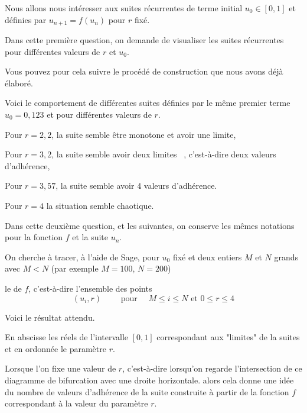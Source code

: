 \change

Nous allons nous intéresser aux suites récurrentes de terme initial $u_0 \in [0,1]$ et définies par $u_{n+1} = f(u_n)$ pour $r$ fixé.

\change

Dans cette première question, on demande de visualiser les suites récurrentes pour différentes valeurs de $r$ et $u_0$. 

Vous pouvez pour cela suivre le procédé de construction que nous avons déjà élaboré.

\diapo
Voici le comportement de différentes suites définies par le même premier terme $u_0=0,123$ et pour différentes valeurs de $r$.


Pour $r=2,2$, la suite semble être monotone et avoir une limite,

\change

Pour $r=3,2$, la suite semble avoir \og deux limites \fg\ , c'est-à-dire
  deux valeurs d'adhérence,

  \change
Pour $r=3,57$, la suite semble avoir $4$ valeurs d'adhérence.

 \change
 Pour  $r=4$ la situation semble chaotique.

\diapo

Dans cette deuxième question, et les suivantes, on conserve les mêmes notations pour la fonction $f$ et la suite $u_n$.

\change

On cherche à tracer, à l'aide de Sage, pour $u_0$ fixé et deux entiers $M$ et $N$ grands avec $M<N$ (par exemple $M=100$, $N=200$)

le  de $f$, c'est-à-dire l'ensemble des points
  $$(u_i,r) \qquad \text{ pour } \quad M \le i \le N \text{ et } 0 \le r \le 4$$

\diapo

Voici le résultat attendu.

En abscisse les réels de l'intervalle $[0,1]$  correspondant aux "limites" de la suites
et en ordonnée le paramètre $r$.


Lorsque l'on fixe une valeur de $r$, c'est-à-dire lorsqu'on regarde 
l'intersection de ce diagramme de bifurcation avec une droite horizontale.
alors cela donne une idée du nombre de valeurs d'adhérence de la suite 
construite à partir de la fonction $f$ correspondant à la valeur du paramètre $r$.

